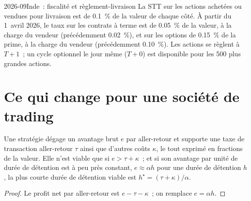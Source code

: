 \begin{dated}{2026-09}{Inde~: fiscalité et règlement-livraison}\label{dat:m1:asian-and-emerging-equity-markets:india}
La STT sur les actions achetées ou vendues pour livraison est de 0.1~\% de la valeur de chaque côté.
À partir du 1~avril 2026, le taux sur les contrats à terme est de 0.05~\% de la valeur, à la charge
du vendeur (précédemment 0.02~\%), et sur les options de 0.15~\% de la prime, à la charge du
vendeur (précédemment 0.10~\%). Les actions se règlent à $T{+}1$~; un cycle optionnel le jour même
($T{+}0$) est disponible pour les 500 plus grandes actions.
\end{dated}

\begin{omfigure}

\end{omfigure}

\section{Ce qui change pour une société de trading}

\begin{proposition}\label{prop:m1:asian-and-emerging-equity-markets:floor}
Une stratégie dégage un avantage brut $e$ par aller-retour et supporte une
taxe de transaction aller-retour $\tau$ ainsi que d'autres coûts $\kappa$, le tout exprimé en fractions de la valeur.
Elle n'est viable que si $e > \tau + \kappa$~; et si son avantage par unité de durée de détention
est à peu près constant, $e \approx \alpha h$ pour une durée de détention $h$, la
plus courte durée de détention viable est $h^\star = (\tau+\kappa)/\alpha$.
\end{proposition}
\begin{proof}
Le profit net par aller-retour est $e - \tau - \kappa$~; on remplace $e = \alpha h$.
\end{proof}

